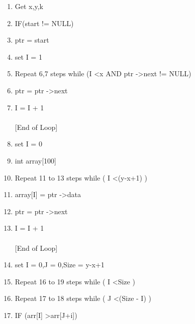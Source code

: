 \documentclass[a4paper,12pt]{article}
\begin{document}
\begin{enumerate}[Step 1:]

    \item Get x,y,k

    \item IF(start != NULL)
    \item \hspace*{5mm} ptr = start 
    \item  \hspace*{5mm} set I = 1
    \item  \hspace*{5mm}Repeat 6,7 steps  while (I \textless x  AND  ptr -\textgreater  next != NULL)
    \item  \hspace*{15mm} ptr = ptr -\textgreater  next
    \item  \hspace*{15mm} I = I + 1\\
    \\  \hspace*{5mm} [End of Loop]
    \item  \hspace*{5mm} set I = 0
    \item  \hspace*{5mm} int array[100]
    \item  \hspace*{5mm}Repeat 11 to 13 steps  while ( I \textless (y-x+1) )
    \item  \hspace*{15mm} array[I] = ptr -\textgreater  data
    \item  \hspace*{15mm} ptr = ptr -\textgreater  next
    \item  \hspace*{15mm} I = I + 1\\
    \\  \hspace*{5mm} [End of Loop]
    \item \hspace*{5mm} set I = 0,J = 0,Size = y-x+1
    \item \hspace*{5mm} Repeat 16 to 19 steps  while ( I \textless Size )
    \item \hspace*{15mm} Repeat 17 to 18 steps  while ( J \textless (Size - I) )
    \item \hspace*{25mm} IF (arr[I] \textgreater arr[J+i])\\

\end{enumerate}
\end{document}
